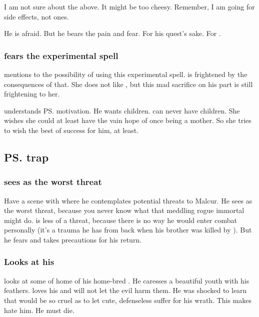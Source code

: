 \begin{garbage}
I am not sure about the above. 
It might be too cheesy. 
Remember, I am going for  side effects, not  ones. 

He is afraid. 
But he bears the pain and fear. 
For his quest's sake. 
For \Firaxel. 





\subsubsection{\Achsah{} fears the experimental spell}
\Teshrial{} mentions to \Achsah{} the possibility of using this experimental spell. 
\Achsah{} is frightened by the consequences of that. 
She does not like \Teshrial, but this mad sacrifice on his part is still frightening to her. 

\Achsah{} understands \ps{\Teshrial} motivation. 
He wants children. 
\Achsah{} can never have children. 
She wishes she could at least have the vain hope of once being a mother. 
So she tries to wish the best of success for him, at least. 







\subsection{\ps{\Teshrial} trap}





\subsubsection{\Teshrial{} sees \Ishnaruchaefir{} as the worst threat}
Have a scene with \Teshrial{} where he contemplates potential threats to Malcur. 
He sees \Ishnaruchaefir{} as the worst threat, because you never know what that meddling rogue immortal might do. 
\Secherdamon{} is less of a threat, because there is no way he would enter combat personally (it's a trauma he has from back when his brother was killed by \resphain). 
But he fears \Ishnaruchaefir{} and takes precautions for his return. 





\subsubsection{Looks at his \humans}
\Teshrial{} looks at some of home of his home-bred \humans. 
He caresses a beautiful youth with his feathers. 
\Teshrial{} loves his \humans{} and will not let the evil \Ishnaruchaefir{} harm them. 
He was shocked to learn that \Ishnaruchaefir{} would be so cruel as to let cute, defenseless \humans{} suffer for his wrath. 
This makes \Teshrial{} hate him.
He must die. 






\end{garbage}
